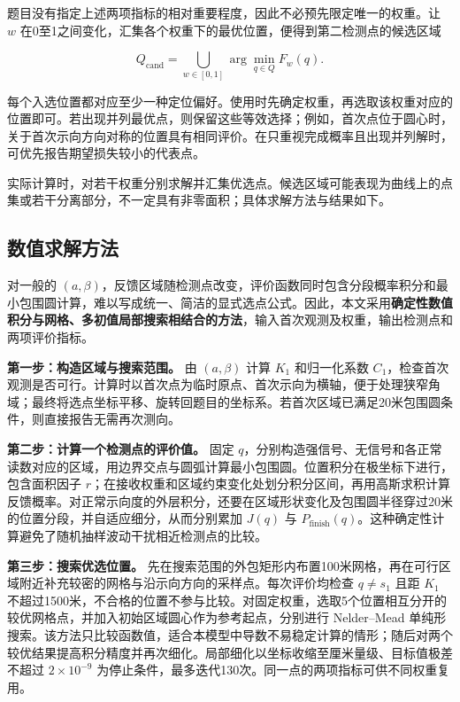 题目没有指定上述两项指标的相对重要程度，因此不必预先限定唯一的权重。让 \(w\) 在0至1之间变化，汇集各个权重下的最优位置，便得到第二检测点的候选区域

\begin{equation}
 Q_{\mathrm{cand}}=\bigcup_{w\in[0,1]}\arg\min_{q\in Q}F_w(q).
\label{eq:q2-candidate-region}
\end{equation}

每个入选位置都对应至少一种定位偏好。使用时先确定权重，再选取该权重对应的位置即可。若出现并列最优点，则保留这些等效选择；例如，首次点位于圆心时，关于首次示向方向对称的位置具有相同评价。在只重视完成概率且出现并列解时，可优先报告期望损失较小的代表点。

实际计算时，对若干权重分别求解并汇集优选点。候选区域可能表现为曲线上的点集或若干分离部分，不一定具有非零面积；具体求解方法与结果如下。

\subsection{数值求解方法}

对一般的 \((a,\beta)\)，反馈区域随检测点改变，评价函数同时包含分段概率积分和最小包围圆计算，难以写成统一、简洁的显式选点公式。因此，本文采用\textbf{确定性数值积分与网格、多初值局部搜索相结合的方法}，输入首次观测及权重，输出检测点和两项评价指标。

\textbf{第一步：构造区域与搜索范围。} 由 \((a,\beta)\) 计算 \(K_1\) 和归一化系数 \(C_1\)，检查首次观测是否可行。计算时以首次点为临时原点、首次示向为横轴，便于处理狭窄角域；最终将选点坐标平移、旋转回题目的坐标系。若首次区域已满足20米包围圆条件，则直接报告无需再次测向。

\textbf{第二步：计算一个检测点的评价值。} 固定 \(q\)，分别构造强信号、无信号和各正常读数对应的区域，用边界交点与圆弧计算最小包围圆。位置积分在极坐标下进行，包含面积因子 \(r\)；在接收权重和区域约束变化处划分积分区间，再用高斯求积计算反馈概率。对正常示向度的外层积分，还要在区域形状变化及包围圆半径穿过20米的位置分段，并自适应细分，从而分别累加 \(J(q)\) 与 \(P_{\mathrm{finish}}(q)\)。这种确定性计算避免了随机抽样波动干扰相近检测点的比较。

\textbf{第三步：搜索优选位置。} 先在搜索范围的外包矩形内布置100米网格，再在可行区域附近补充较密的网格与沿示向方向的采样点。每次评价均检查 \(q\ne s_1\) 且距 \(K_1\) 不超过1500米，不合格的位置不参与比较。对固定权重，选取5个位置相互分开的较优网格点，并加入初始区域圆心作为参考起点，分别进行 Nelder--Mead 单纯形搜索。该方法只比较函数值，适合本模型中导数不易稳定计算的情形；随后对两个较优结果提高积分精度并再次细化。局部细化以坐标收缩至厘米量级、目标值极差不超过 \(2\times10^{-9}\) 为停止条件，最多迭代130次。同一点的两项指标可供不同权重复用。

